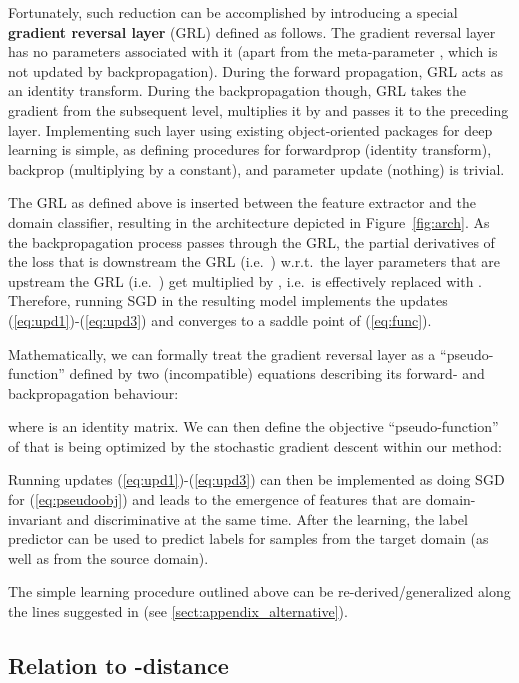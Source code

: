 \documentclass{article}
\newcommand{\fig}[1]{Figure~\ref{fig:#1}}
\newcommand{\eq}[1]{(\ref{eq:#1})}
\begin{document}
Fortunately, such reduction can be accomplished by introducing a special {\bf gradient reversal layer} (GRL) defined as follows. The gradient reversal layer has no parameters associated with it (apart from the meta-parameter , which is not updated by backpropagation). During the forward propagation, GRL acts as an identity transform. During the backpropagation though, GRL takes the gradient from the subsequent level, multiplies it by  and passes it to the preceding layer. Implementing such layer using existing object-oriented packages for deep learning is simple, as defining procedures for forwardprop (identity transform), backprop (multiplying by a constant), and parameter update (nothing) is trivial. 

The GRL as defined above is inserted between the feature extractor and the domain classifier, resulting in the architecture depicted in \fig{arch}. As the backpropagation process passes through the GRL, the partial derivatives of the loss that is downstream the GRL (i.e.\ ) w.r.t.\ the layer parameters that are upstream the GRL (i.e.\ ) get multiplied by , i.e.\  is effectively replaced with . Therefore, running SGD in the resulting model implements the updates \eq{upd1}-\eq{upd3} and converges to a saddle point of \eq{func}.

Mathematically, we can formally treat the gradient reversal layer as a ``pseudo-function''  defined by two (incompatible) equations describing its forward- and backpropagation behaviour:

where  is an identity matrix.
We can then define the objective ``pseudo-function'' of  that is being optimized by the stochastic gradient descent within our method:


Running updates \eq{upd1}-\eq{upd3} can then be implemented as doing SGD for \eq{pseudoobj} and leads to the emergence of features that are domain-invariant and discriminative at the same time. After the learning, the label predictor  can be used to predict labels for samples from the target domain (as well as from the source domain).

The simple learning procedure outlined above can be re-derived/generalized along the lines suggested in \cite{Goodfellow14} (see \ref{sect:appendix_alternative}).

\subsection{Relation to -distance}
\label{sect:theory}
\end{document}
